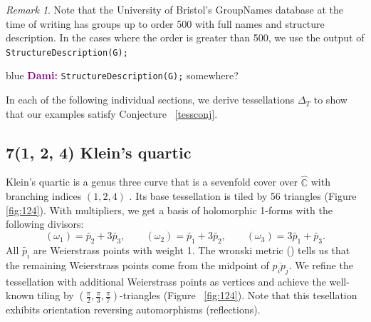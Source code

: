 \documentclass[12pt,reqno]{amsart}
\newenvironment{dami}{
  \medskip
\begin{color}{blue}
    \textcolor{purple}{\textbf{Dami:}} 
}{
\end{color}
  \medskip
}
\newcommand{\C}{\mathbb{C}}
\theoremstyle{definition}
\theoremstyle{remark}
\newtheorem*{remark}{Remark}
\begin{document}
\begin{remark} Note that the University of Bristol's GroupNames database at the time of writing has groups up to order 500 with full names and structure description. In the cases where the order is greater than 500, we use the output of \texttt{StructureDescription(G);}  \end{remark}

\begin{dami} \texttt{StructureDescription(G);} somewhere? \end{dami}


In each of the following individual sections, we derive tessellations $\Delta_T$ to show that our examples satisfy Conjecture ~\ref{tessconj}.



\subsection*{7(1, 2, 4) Klein's quartic } 



Klein's quartic is a genus three curve that is a sevenfold cover over $\widehat{\C}$ with branching indices $(1,2,4)$ \cite{kw}. Its base tessellation is tiled by 56 triangles (Figure~ \cref{fig:124}). With multipliers, we get a basis of holomorphic 1-forms with the following divisors: $$(\omega_1) = \widetilde{p_2} + 3 \widetilde{p_3}, \qquad (\omega_2) = \widetilde{p_1} + 3 \widetilde{p_2}, \qquad (\omega_3) = 3 \widetilde{p_1} + \widetilde{p_3}.$$ All $\widetilde{p_i}$ are Weierstrass points with weight 1. The wronski metric (\cite{code:wronski}) tells us that the remaining Weierstrass points come from the midpoint of $\overline{p_i p_j}.$ We refine the tessellation with additional Weierstrass points as vertices and achieve the well-known tiling by $(\frac{\pi}{2}, \frac{\pi}{3}, \frac{\pi}{7})$-triangles (Figure~ \cref{fig:124}). Note that this tesellation exhibits orientation reversing automorphisms (reflections). 
\end{document}
